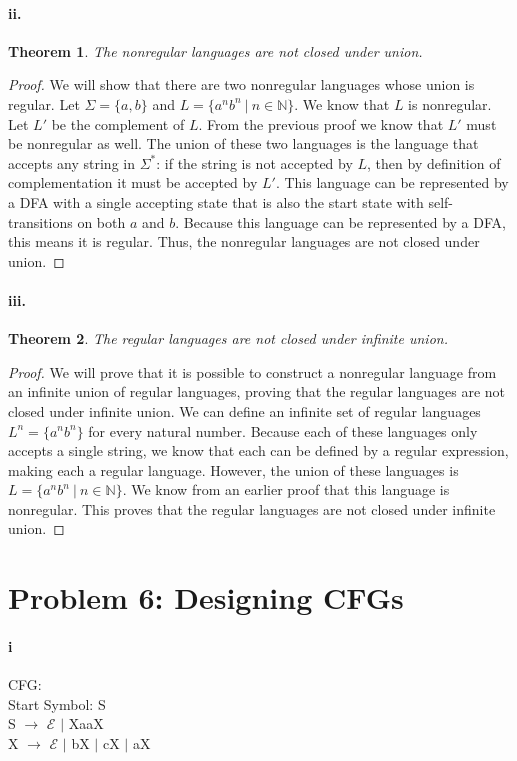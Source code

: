 \documentclass[10pt,letter]{article}
\newtheorem*{thm}{Theorem}
\begin{document}
\paragraph{ii.}
\begin{thm} The nonregular languages are not closed under union. \end{thm}
\begin{proof} We will show that there are two nonregular languages whose union is regular. Let $\Sigma = \{a, b\}$ and $L = \{a^nb^n \ | \ n \in \mathbb{N} \}$. We know that $L$ is nonregular. Let $L'$ be the complement of $L$. From the previous proof we know that $L'$ must be nonregular as well. The union of these two languages is the language that accepts any string in $\Sigma^*$: if the string is not accepted by $L$, then by definition of complementation it must be accepted by $L'$. This language can be represented by a DFA with a single accepting state that is also the start state with self-transitions on both $a$ and $b$. Because this language can be represented by a DFA, this means it is regular. Thus, the nonregular languages are not closed under union.
\end{proof}

\paragraph{iii.}
\begin{thm} The regular languages are not closed under infinite union. \end{thm}
\begin{proof}
We will prove that it is possible to construct a nonregular language from an infinite union of regular languages, proving that the regular languages are not closed under infinite union. We can define an infinite set of regular languages $L^n = \{a^n b^n\}$ for every natural number. Because each of these languages only accepts a single string, we know that each can be defined by a regular expression, making each a regular language. However, the union of these languages is $L = \{ a^n b^n \ | \ n \in \mathbb{N} \}$. We know from an earlier proof that this language is nonregular. This proves that the regular languages are not closed under infinite union.
\end{proof}

\section*{Problem 6: Designing CFGs}
\paragraph{i} CFG: \\
Start Symbol: S \\
S $\rightarrow$ $\mathcal{E}$ $\mid$ XaaX \\
X $\rightarrow$ $\mathcal{E}$ $\mid$ bX $\mid$ cX $\mid$ aX \\
\end{document}
